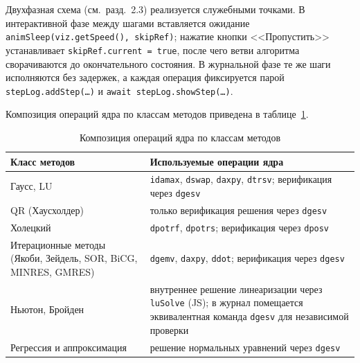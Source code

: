 \documentclass[12pt, oneside]{book}
\begin{document}
    \quad Двухфазная схема (см.\ разд.~2.3) реализуется служебными точками. В интерактивной фазе между шагами вставляется ожидание\\ \texttt{animSleep(viz.getSpeed(), skipRef)}; нажатие кнопки <<Пропустить>> устанавливает \texttt{skipRef.current = true}, после чего ветви алгоритма сворачиваются до окончательного состояния. В журнальной фазе те же шаги исполняются без задержек, а каждая операция фиксируется парой \texttt{stepLog.addStep(\ldots)} и \texttt{await stepLog.showStep(\ldots)}.

    \quad Композиция операций ядра по классам методов приведена в таблице~\ref{tab:method_blas}.

\begin{table}[!htbp]
\centering
\scriptsize
\renewcommand{\arraystretch}{1.15}
\begin{tabular}{|p{4.2cm}|p{8.5cm}|}
\hline
\rowcolor{thbg} \textbf{Класс методов} & \textbf{Используемые операции ядра} \\
\hline
Гаусс, LU & \texttt{idamax}, \texttt{dswap}, \texttt{daxpy}, \texttt{dtrsv}; верификация через \texttt{dgesv} \\
\hline
QR (Хаусхолдер) & только верификация решения через \texttt{dgesv} \\
\hline
Холецкий & \texttt{dpotrf}, \texttt{dpotrs}; верификация через \texttt{dposv} \\
\hline
Итерационные методы (Якоби, Зейдель, SOR, BiCG, MINRES, GMRES) & \texttt{dgemv}, \texttt{daxpy}, \texttt{ddot}; верификация через \texttt{dgesv} \\
\hline
Ньютон, Бройден & внутреннее решение линеаризации через \texttt{luSolve} (JS); в журнал помещается эквивалентная команда \texttt{dgesv} для независимой проверки \\
\hline
Регрессия и аппроксимация & решение нормальных уравнений через \texttt{dgesv} \\
\hline
\end{tabular}
\caption{Композиция операций ядра по классам методов}
\label{tab:method_blas}
\end{table}
\end{document}
